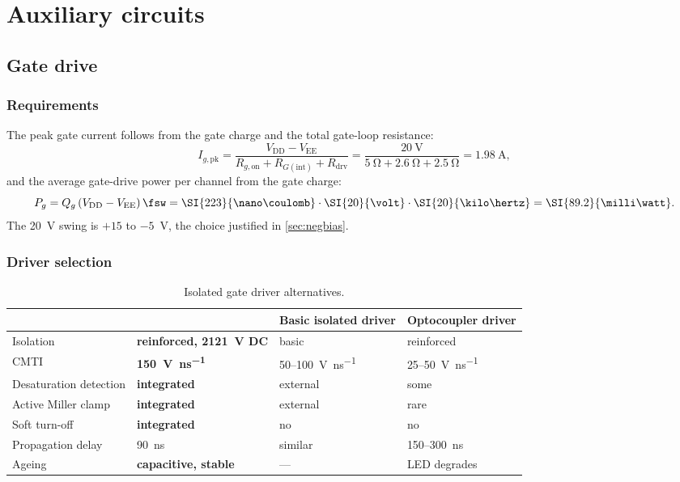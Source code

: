 \chapter{Auxiliary circuits}
\label{ch:aux}

\section{Gate drive}

\subsection{Requirements}

The peak gate current follows from the gate charge and the total gate-loop
resistance:
%
\begin{equation}
  I_{g,\mathrm{pk}} = \frac{V_\mathrm{DD} - V_\mathrm{EE}}
                           {R_{g,\mathrm{on}} + R_{G(\mathrm{int})} + R_\mathrm{drv}}
  = \frac{\SI{20}{\volt}}{\SI{5}{\ohm} + \SI{2.6}{\ohm} + \SI{2.5}{\ohm}}
  = \SI{1.98}{\ampere},
\end{equation}
%
and the average gate-drive power per channel from the gate charge:
%
\begin{equation}
  P_g = Q_g \, (V_\mathrm{DD}-V_\mathrm{EE}) \, \fsw
      = \SI{223}{\nano\coulomb} \cdot \SI{20}{\volt} \cdot \SI{20}{\kilo\hertz}
      = \SI{89.2}{\milli\watt}.
\end{equation}
%
The \SI{20}{\volt} swing is $+15$ to $-5$~V, the choice justified in
\cref{sec:negbias}.

\subsection{Driver selection}

\begin{table}[htbp]
\centering
\caption{Isolated gate driver alternatives.}
\label{tab:driver}
\small
\begin{tabularx}{\textwidth}{lYYY}
\toprule
 & \textbf{\driver{}} & Basic isolated driver & Optocoupler driver \\
\midrule
Isolation & \textbf{reinforced, \SI{2121}{\volt} DC} & basic & reinforced \\
CMTI & \textbf{\SI{150}{\volt\per\nano\second}} & \SI{50}{}--\SI{100}{\volt\per\nano\second} & \SI{25}{}--\SI{50}{\volt\per\nano\second} \\
Desaturation detection & \textbf{integrated} & external & some \\
Active Miller clamp & \textbf{integrated} & external & rare \\
Soft turn-off & \textbf{integrated} & no & no \\
Propagation delay & \SI{90}{\nano\second} & similar & \SI{150}{}--\SI{300}{\nano\second} \\
Ageing & \textbf{capacitive, stable} & --- & LED degrades \\
\bottomrule
\end{tabularx}
\end{table}

